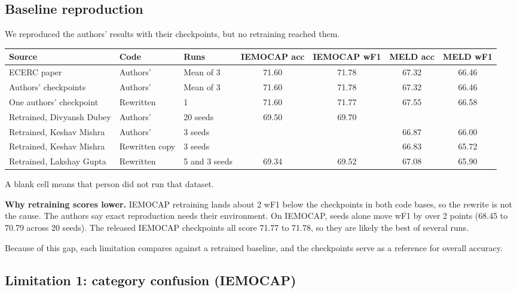 \documentclass[11pt,a4paper]{article}
\begin{document}
\subsection{Baseline reproduction}
\label{sec:repro}

We reproduced the authors' results with their checkpoints, but no retraining reached them.

\begin{center}
\begin{adjustbox}{max width=\linewidth}
\begin{tabular}{lllcccc}
\toprule
Source & Code & Runs & IEMOCAP acc & IEMOCAP wF1 & MELD acc & MELD wF1 \\
\midrule
ECERC paper & Authors' & Mean of 3 & 71.60 & 71.78 & 67.32 & 66.46 \\
Authors' checkpoints & Authors' & Mean of 3 & 71.60 & 71.78 & 67.32 & 66.46 \\
One authors' checkpoint & Rewritten & 1 & 71.60 & 71.77 & 67.55 & 66.58 \\
Retrained, Divyansh Dubey & Authors' & 20 seeds & 69.50 & 69.70 & & \\
Retrained, Keshav Mishra & Authors' & 3 seeds & & & 66.87 & 66.00 \\
Retrained, Keshav Mishra & Rewritten copy & 3 seeds & & & 66.83 & 65.72 \\
Retrained, Lakshay Gupta & Rewritten & 5 and 3 seeds & 69.34 & 69.52 & 67.08 & 65.90 \\
\bottomrule
\end{tabular}
\end{adjustbox}
\end{center}

A blank cell means that person did not run that dataset.

\textbf{Why retraining scores lower.} IEMOCAP retraining lands about 2 wF1 below the checkpoints in both code bases, so the rewrite is not the cause. The authors say exact reproduction needs their environment. On IEMOCAP, seeds alone move wF1 by over 2 points (68.45 to 70.79 across 20 seeds). The released IEMOCAP checkpoints all score 71.77 to 71.78, so they are likely the best of several runs.

Because of this gap, each limitation compares against a retrained baseline, and the checkpoints serve as a reference for overall accuracy.

\subsection{Limitation 1: category confusion (IEMOCAP)}
\end{document}
